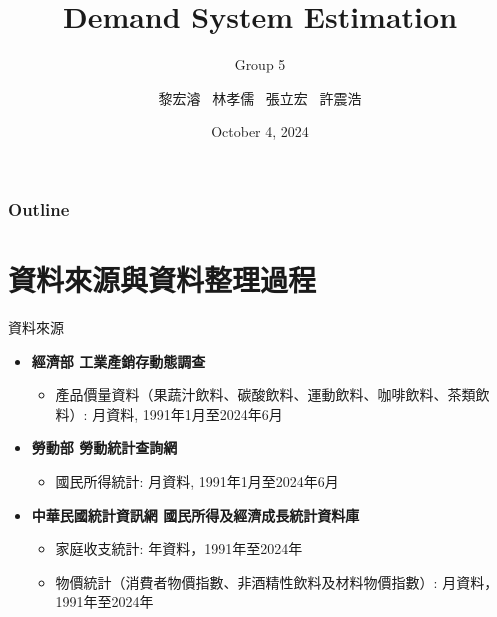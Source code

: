 \documentclass[12pt]{beamer}
\title[]  
{Demand System Estimation}
\subtitle[short subtitle]{Group 5}
\author{黎宏濬 \ 林孝儒 \ 張立宏 \ 許震浩}
\institute[short]{\inst{}Department of Agricultural Economics, NTU}
\date
 {October 4, 2024}
\begin{document}
\begin{frame}{}
    \titlepage
\end{frame}

\begin{frame}
    \frametitle{Outline}
    \tableofcontents[]
\end{frame}


\section{資料來源與資料整理過程}

\begin{frame}{資料來源}
	\begin{itemize}
		\item \textbf{經濟部 工業產銷存動態調查} 
		\begin{itemize}
			\vspace*{0.1cm}
			\item 產品價量資料（果蔬汁飲料、碳酸飲料、運動飲料、咖啡飲料、茶類飲料）: 月資料, 1991年1月至2024年6月 \vspace*{0.1cm}
		\end{itemize} \vspace*{0.3cm}

		\item \textbf{勞動部 勞動統計查詢網}
		\begin{itemize}
			\vspace*{0.1cm}
			\item 國民所得統計: 月資料, 1991年1月至2024年6月
		\end{itemize} \vspace*{0.3cm}

		\item \textbf{中華民國統計資訊網 國民所得及經濟成長統計資料庫}
		\begin{itemize}
			\vspace*{0.1cm}
			\item 家庭收支統計: 年資料，1991年至2024年\vspace*{0.1cm}
			\item 物價統計（消費者物價指數、非酒精性飲料及材料物價指數）: 月資料，1991年至2024年
		\end{itemize}
	\end{itemize}
\end{frame}
\end{document}
